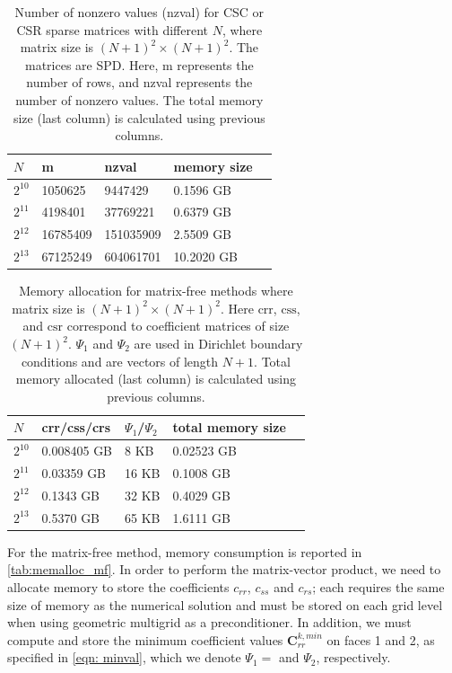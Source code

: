 \begin{table}[t]
\small\sf\centering
\begin{center}
\begin{tabular}{l l l l l }
\toprule
$N$  & m & nzval & memory size \\
\midrule
$2^{10}$& 1050625  & 9447429 & 0.1596 GB \\
$2^{11}$ & 4198401 & 37769221& 0.6379 GB &  \\
$2^{12}$ & 16785409   & 151035909   & 2.5509 GB &  \\
$2^{13}$ & 67125249   & 604061701   & 10.2020 GB & \\
\bottomrule
\end{tabular}
\end{center}
\caption{Number of nonzero values (nzval) for CSC or CSR sparse matrices with different $N$, where matrix size is $(N+1)^2 \times (N+1)^2$. The matrices are SPD. Here, m represents the number of rows, and nzval represents the number of nonzero values. The total memory size (last column) is calculated using previous columns.
}
\label{tab:memalloc_comparison}
\end{table}


\begin{table}[t!]
\small\sf\centering
\begin{center}
\begin{tabular}{l l l l l }
\toprule
$N$  & crr/css/crs & $\Psi_1$/$\Psi_2$ & total memory size \\
\midrule
$2^{10}$& 0.008405 GB  & 8 KB & 0.02523 GB \\
$2^{11}$ & 0.03359 GB & 16 KB &  0.1008 GB \\
$2^{12}$ & 0.1343 GB  & 32 KB  & 0.4029 GB &  \\
$2^{13}$ & 0.5370 GB   & 65 KB   & 1.6111 GB & \\
\bottomrule
\end{tabular}
\end{center}
\caption{Memory allocation for matrix-free methods where matrix size is $(N+1)^2 \times (N+1)^2$. Here $\mathrm{crr}$, $\mathrm{css}$, and $\mathrm{csr}$ correspond to coefficient matrices of size $(N+1)^2$. $\Psi_1$ and $\Psi_2$ are used in Dirichlet boundary conditions and are vectors of length $N+1$. Total memory allocated (last column) is calculated using previous columns.
}
\label{tab:memalloc_mf}
\end{table}

For the matrix-free method, memory consumption is reported in \autoref{tab:memalloc_mf}. 
In order to perform the matrix-vector product, we need to allocate memory to store the coefficients $c_{rr}$, $c_{ss}$ and $c_{rs}$; each requires the same size of memory as the numerical solution and must be stored on each grid level when using geometric multigrid as a preconditioner. 
In addition, we must compute and store the minimum coefficient values ${\boldsymbol{C}}_{rr}^{k, min}$ on faces 1 and 2, as specified in \eqref{eqn: minval}, which we denote $\Psi_1 = $ and $\Psi_2$, respectively. 


